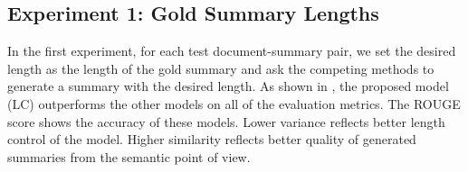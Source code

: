 \subsection{Experiment 1: Gold Summary Lengths}
\label{sec:exp1}


In the first experiment, for each test document-summary pair, we set the desired length as the length of the gold summary
and ask the competing methods to generate a summary
with the desired length. As shown 
in , the proposed model (LC)
outperforms the other models on all of the evaluation metrics.
The ROUGE score shows the accuracy of these models.
Lower variance reflects better length control of the model.
Higher similarity reflects better quality of generated summaries from the semantic 
point of view.


